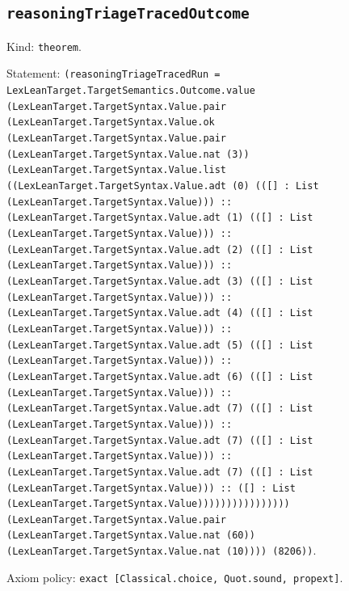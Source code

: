 \documentclass[11pt]{article}
\begin{document}
\subsection*{\texttt{reasoningTriageTracedOutcome}}
\noindent Kind: \texttt{theorem}.\par
\noindent Statement: \texttt{(reasoningTriageTracedRun = LexLeanTarget.TargetSemantics.Outcome.value (LexLeanTarget.TargetSyntax.Value.pair (LexLeanTarget.TargetSyntax.Value.ok (LexLeanTarget.TargetSyntax.Value.pair (LexLeanTarget.TargetSyntax.Value.nat (3)) (LexLeanTarget.TargetSyntax.Value.list ((LexLeanTarget.TargetSyntax.Value.adt (0) (([] : List (LexLeanTarget.TargetSyntax.Value))) :: (LexLeanTarget.TargetSyntax.Value.adt (1) (([] : List (LexLeanTarget.TargetSyntax.Value))) :: (LexLeanTarget.TargetSyntax.Value.adt (2) (([] : List (LexLeanTarget.TargetSyntax.Value))) :: (LexLeanTarget.TargetSyntax.Value.adt (3) (([] : List (LexLeanTarget.TargetSyntax.Value))) :: (LexLeanTarget.TargetSyntax.Value.adt (4) (([] : List (LexLeanTarget.TargetSyntax.Value))) :: (LexLeanTarget.TargetSyntax.Value.adt (5) (([] : List (LexLeanTarget.TargetSyntax.Value))) :: (LexLeanTarget.TargetSyntax.Value.adt (6) (([] : List (LexLeanTarget.TargetSyntax.Value))) :: (LexLeanTarget.TargetSyntax.Value.adt (7) (([] : List (LexLeanTarget.TargetSyntax.Value))) :: (LexLeanTarget.TargetSyntax.Value.adt (7) (([] : List (LexLeanTarget.TargetSyntax.Value))) :: (LexLeanTarget.TargetSyntax.Value.adt (7) (([] : List (LexLeanTarget.TargetSyntax.Value))) :: ([] : List (LexLeanTarget.TargetSyntax.Value)))))))))))))))) (LexLeanTarget.TargetSyntax.Value.pair (LexLeanTarget.TargetSyntax.Value.nat (60)) (LexLeanTarget.TargetSyntax.Value.nat (10)))) (8206))}.\par
\noindent Axiom policy: \texttt{exact [Classical.choice, Quot.sound, propext]}.\par
\end{document}
